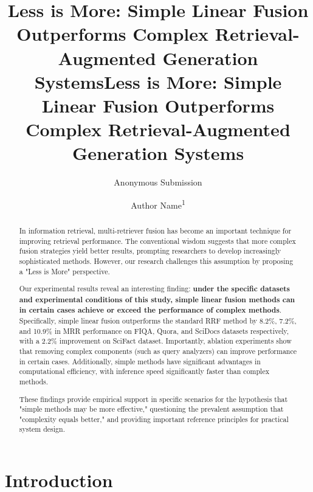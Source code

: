 \documentclass[letterpaper]{article} %
\title{Less is More: Simple Linear Fusion Outperforms Complex Retrieval-Augmented Generation Systems}
\title{Less is More: Simple Linear Fusion Outperforms Complex Retrieval-Augmented Generation Systems}
\author{
    Anonymous Submission
}
\author{
    Author Name\textsuperscript{\rm 1}
}
\begin{document}
\maketitle

\begin{abstract}
In information retrieval, multi-retriever fusion has become an important technique for improving retrieval performance. The conventional wisdom suggests that more complex fusion strategies yield better results, prompting researchers to develop increasingly sophisticated methods. However, our research challenges this assumption by proposing a "Less is More" perspective.

Our experimental results reveal an interesting finding: \textbf{under the specific datasets and experimental conditions of this study, simple linear fusion methods can in certain cases achieve or exceed the performance of complex methods}. Specifically, simple linear fusion outperforms the standard RRF method by 8.2\%, 7.2\%, and 10.9\% in MRR performance on FIQA, Quora, and SciDocs datasets respectively, with a 2.2\% improvement on SciFact dataset. Importantly, ablation experiments show that removing complex components (such as query analyzers) can improve performance in certain cases. Additionally, simple methods have significant advantages in computational efficiency, with inference speed significantly faster than complex methods.

These findings provide empirical support in specific scenarios for the hypothesis that "simple methods may be more effective," questioning the prevalent assumption that "complexity equals better," and providing important reference principles for practical system design.
\end{abstract}

\ifdefined\aaaianonymous
\else
\begin{links}
\end{links}
\fi

\section{Introduction}
\end{document}
